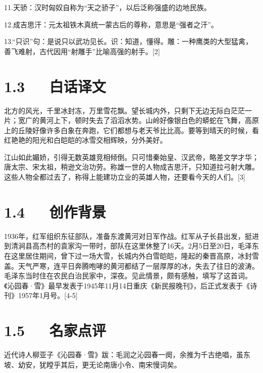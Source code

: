 \documentclass[letterpaper,10pt,english]{sphinxmanual}
\begin{document}
11.天骄：汉时匈奴自称为“天之骄子”，以后泛称强盛的边地民族。

12.成吉思汗：元太祖铁木真统一蒙古后的尊称，意思是“强者之汗”。

13.“只识”句：是说只以武功见长。识：知道，懂得。雕：一种鹰类的大型猛禽，善飞难射，古代因用“射雕手”比喻高强的射手。{[}2{]}


\section{1.3   白话译文}
\label{\detokenize{p01_u6563_u6587/_u6bdb_u6cfd_u4e1c-_u6c81_u56ed_u6625_xb7_u96ea:id5}}
北方的风光，千里冰封冻，万里雪花飘。望长城内外，只剩下无边无际白茫茫一片；宽广的黄河上下，顿时失去了滔滔水势。山岭好像银白色的蟒蛇在飞舞，高原上的丘陵好像许多白象在奔跑，它们都想与老天爷比比高。要等到晴天的时候，看红艳艳的阳光和白皑皑的冰雪交相辉映，分外美好。

江山如此媚娇，引得无数英雄竞相倾倒。只可惜秦始皇、汉武帝，略差文学才华；唐太宗、宋太祖，稍逊文治功劳。称雄一世的人物成吉思汗，只知道拉弓射大雕。这些人物全都过去了，称得上能建功立业的英雄人物，还要看今天的人们。{[}3{]}


\section{1.4   创作背景}
\label{\detokenize{p01_u6563_u6587/_u6bdb_u6cfd_u4e1c-_u6c81_u56ed_u6625_xb7_u96ea:id6}}
1936年，红军组织东征部队，准备东渡黄河对日军作战。红军从子长县出发，挺进到清涧县高杰村的袁家沟一带时，部队在这里休整了16天。2月5日至20日，毛泽东在这里居住期间，曾下过一场大雪，长城内外白雪皑皑，隆起的秦晋高原，冰封雪盖。天气严寒，连平日奔腾咆哮的黄河都结了一层厚厚的冰，失去了往日的波涛。毛泽东当时住在农民白治民家中，深夜。见此情景，颇有感触，填写了这首词。《沁园春·雪》最早发表于1945年11月14日重庆《新民报晚刊》，后正式发表于《诗刊》1957年1月号。{[}4-5{]}


\section{1.5   名家点评}
\label{\detokenize{p01_u6563_u6587/_u6bdb_u6cfd_u4e1c-_u6c81_u56ed_u6625_xb7_u96ea:id7}}
近代诗人柳亚子《沁园春·雪》跋：毛润之沁园春一阕，余推为千古绝唱，虽东坡、幼安，犹瞠乎其后，更无论南唐小令、南宋慢词矣。
\end{document}
